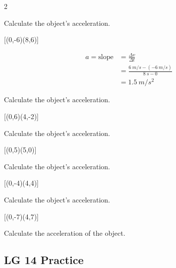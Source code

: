 \documentclass[answers]{exam}
\begin{document}
\begin{questions}
\begin{multicols}{2}

\question
Calculate the object's acceleration.

[(0,-6)(8,6)]

\begin{solution}

\begin{align*}
    a = \text{slope} &= \frac{\Delta v}{\Delta t} \\[1ex]
    &= \frac{\SI{6}{m/s} - (-\SI{6}{m/s})}{\SI{8}{s} - 0} \\[1ex]
    &= \boxed{\SI{1.5}{m/s^2}}
\end{align*}
\end{solution}

\question
Calculate the object's acceleration.

[(0,6)(4,-2)]

\question
Calculate the object's acceleration.

[(0,5)(5,0)]

\begin{minipage}{\linewidth}
\question
Calculate the object's acceleration.

[(0,-4)(4,4)]
\end{minipage}

\question
Calculate the object's acceleration.

[(0,-7)(4,7)]

\question
Calculate the acceleration of the object.


\end{multicols}
\end{questions}

\clearpage

\subsection*{LG 14 Practice}
\end{document}
